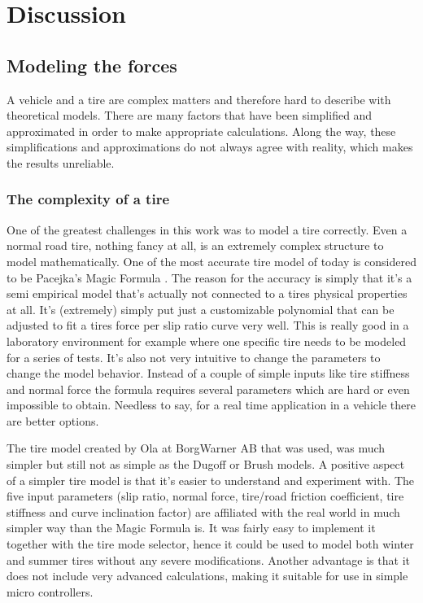 \chapter{Discussion}

\section{Modeling the forces}
A vehicle and a tire are complex matters and therefore hard to describe with theoretical models. There are many factors that have been simplified and approximated in order to make appropriate calculations. Along the way, these simplifications and approximations do not always agree with reality, which makes the results unreliable. 

\subsection{The complexity of a tire}
One of the greatest challenges in this work was to model a tire correctly. Even a normal road tire, nothing fancy at all, is an extremely complex structure to model mathematically. One of the most accurate tire model of today is considered to be Pacejka's Magic Formula \cite{pacejka}. The reason for the accuracy is simply that it's a semi empirical model that's actually not connected to a tires physical properties at all. It's (extremely) simply put just a customizable polynomial that can be adjusted to fit a tires force per slip ratio curve very well. This is really good in a laboratory environment for example where one specific tire needs to be modeled for a series of tests. It's also not very intuitive to change the parameters to change the model behavior. Instead of a couple of simple inputs like tire stiffness and normal force the formula requires several parameters which are hard or even impossible to obtain. Needless to say, for a real time application in a vehicle there are better options.

The tire model created by Ola at BorgWarner AB that was used, was much simpler but still not as simple as the Dugoff or Brush models. A positive aspect of a simpler tire model is that it's easier to understand and experiment with. The five input parameters (slip ratio, normal force, tire/road friction coefficient, tire stiffness and curve inclination factor) are affiliated with the real world in much simpler way than the Magic Formula is. It was fairly easy to implement it together with the tire mode selector, hence it could be used to model both winter and summer tires without any severe modifications. Another advantage is that it does not include very advanced calculations, making it suitable for use in simple micro controllers. 

